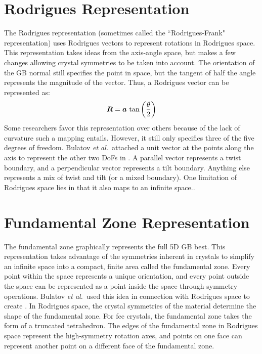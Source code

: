 \documentclass[twoside,senior]{BYUPhys}
\begin{document}
\section{Rodrigues Representation\label{GBReps:Rodrigues}}
The Rodrigues representation (sometimes called the ``Rodrigues-Frank" representation) uses Rodrigues vectors to represent rotations in Rodrigues space.  This representation takes ideas from the axis-angle space, but makes a few changes allowing crystal symmetries to be taken into account.  The orientation of the GB normal still specifies the point in space, but the tangent of half the angle represents the magnitude of the vector. Thus, a Rodrigues vector can be represented as:\cite{morawiec1996, becker1989, frank1988, randle2000, priester2013}
\begin{equation}
\bm{R}=\bm{a}\ \textnormal{tan}\left(\frac{\theta}{2}\right)
\label{eq:rodriguesVec}
\end{equation}
Some researchers favor this representation over others because of the lack of curvature such a mapping entails.\cite{frank1988, randle2000}  However, it still only specifies three of the five degrees of freedom.  Bulatov \emph{et al.}\ attached a unit vector at the points along the axis to represent the other two DoFs in . A parallel vector represents a twist boundary, and a perpendicular vector represents a tilt boundary.  Anything else represents a mix of twist and tilt (or a mixed boundary).  One limitation of Rodrigues space lies in that it also maps to an infinite space.\cite{frank1988, kirch2008}.

\section{Fundamental Zone Representation\label{GBReps:FunZone}}
The fundamental zone graphically represents the full 5D GB best.  This representation takes advantage of the symmetries inherent in crystals\cite{stokes2007} to simplify an infinite space into a compact, finite area called the fundamental zone.\cite{bulatov2014, patala2013, homer2015, morawiec1996, patala2012}  Every point within the space represents a unique orientation, and every point outside the space can be represented as a point inside the space through symmetry operations.\cite{morawiec1996, becker1989, frank1988}  Bulatov \emph{et al.}\ used this idea in connection with Rodrigues space to create .  In Rodrigues space, the crystal symmetries of the material determine the shape of the fundamental zone.\cite{patala2013, morawiec1996}  For fcc crystals, the fundamental zone takes the form of a truncated tetrahedron.\cite{bulatov2014}  The edges of the fundamental zone in Rodrigues space represent the high-symmetry rotation axes, and points on one face can represent another point on a different face of the fundamental zone.  
\end{document}
